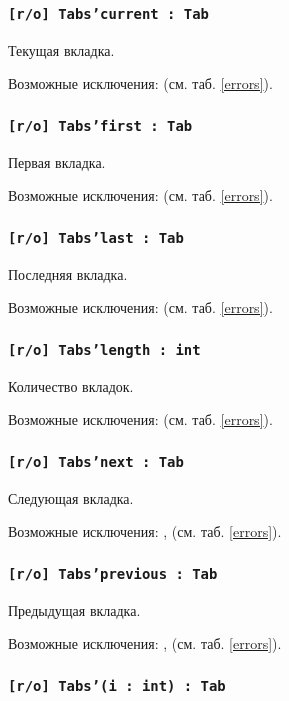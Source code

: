 \subsubsection{\texttt{[r/o] Tabs'current : Tab}}

Текущая вкладка.

Возможные исключения:  (см. таб. \ref{errors}).

\subsubsection{\texttt{[r/o] Tabs'first : Tab}}

Первая вкладка.

Возможные исключения:  (см. таб. \ref{errors}).

\subsubsection{\texttt{[r/o] Tabs'last : Tab}}

Последняя вкладка.

Возможные исключения:  (см. таб. \ref{errors}).

\subsubsection{\texttt{[r/o] Tabs'length : int}}

Количество вкладок.

Возможные исключения:  (см. таб. \ref{errors}).

\subsubsection{\texttt{[r/o] Tabs'next : Tab}}

Следующая вкладка.

Возможные исключения: ,  (см. таб. \ref{errors}).

\subsubsection{\texttt{[r/o] Tabs'previous : Tab}}

Предыдущая вкладка.

Возможные исключения: ,  (см. таб. \ref{errors}).

\subsubsection{\texttt{[r/o] Tabs'(i : int) : Tab}}

